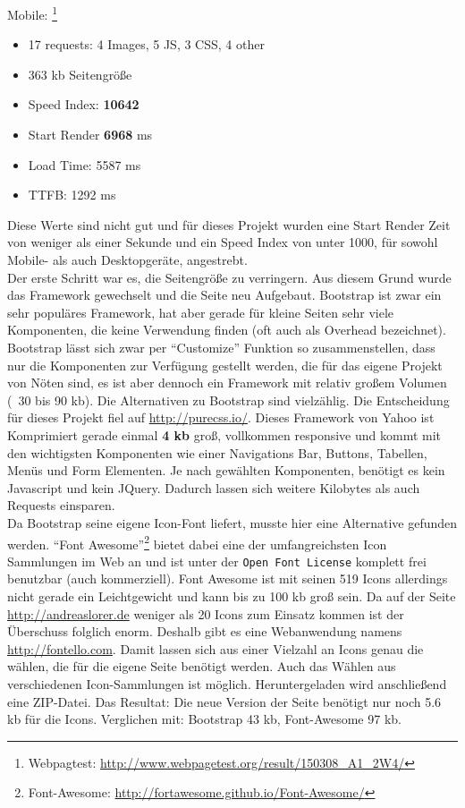 		Mobile: \footnote{Webpagtest: \url{http://www.webpagetest.org/result/150308_A1_2W4/}}
		\begin{itemize}
			\item 17 requests: 4 Images, 5 JS, 3 CSS, 4 other
			\item 363 kb Seitengröße
			\item Speed Index: \textbf{10642}
			\item Start Render \textbf{6968} ms
			\item Load Time: 5587 ms
			\item TTFB: 1292 ms
		\end{itemize}

		Diese Werte sind nicht gut und für dieses Projekt wurden eine Start Render Zeit von weniger als einer Sekunde und ein Speed Index von unter 1000, für sowohl Mobile- als auch Desktopgeräte, angestrebt.\\

		Der erste Schritt war es, die Seitengröße zu verringern. Aus diesem Grund wurde das Framework gewechselt und die Seite neu Aufgebaut. Bootstrap ist zwar ein sehr populäres Framework, hat aber gerade für kleine Seiten sehr viele Komponenten, die keine Verwendung finden (oft auch als Overhead bezeichnet). Bootstrap lässt sich zwar per "`Customize"' Funktion so zusammenstellen, dass nur die Komponenten zur Verfügung gestellt werden, die für das eigene Projekt von Nöten sind, es ist aber dennoch ein Framework mit relativ großem Volumen (~30 bis 90 kb). Die Alternativen zu Bootstrap sind vielzählig. Die Entscheidung für dieses Projekt fiel auf \url{http://purecss.io/}. Dieses Framework von Yahoo ist Komprimiert gerade einmal \textbf{4 kb} groß, vollkommen responsive und kommt mit den wichtigsten Komponenten wie einer Navigations Bar, Buttons, Tabellen, Menüs und Form Elementen. Je nach gewählten Komponenten, benötigt es kein Javascript und kein JQuery. Dadurch lassen sich weitere Kilobytes als auch Requests einsparen.\\
		Da Bootstrap seine eigene Icon-Font liefert, musste hier eine Alternative gefunden werden. "`Font Awesome"'\footnote{Font-Awesome: \url{http://fortawesome.github.io/Font-Awesome/}} bietet dabei eine der umfangreichsten Icon Sammlungen im Web an und ist unter der \texttt{Open Font License} komplett frei benutzbar (auch kommerziell). Font Awesome ist mit seinen 519 Icons allerdings nicht gerade ein Leichtgewicht und kann bis zu 100 kb groß sein. Da auf der Seite \url{http://andreaslorer.de} weniger als 20 Icons zum Einsatz kommen ist der Überschuss folglich enorm. Deshalb gibt es eine Webanwendung namens \url{http://fontello.com}. Damit lassen sich aus einer Vielzahl an Icons genau die wählen, die für die eigene Seite benötigt werden. Auch das Wählen aus verschiedenen Icon-Sammlungen ist möglich. Heruntergeladen wird anschließend eine ZIP-Datei. Das Resultat: Die neue Version der Seite benötigt nur noch 5.6 kb für die Icons. Verglichen mit: Bootstrap 43 kb, Font-Awesome 97 kb.\\

